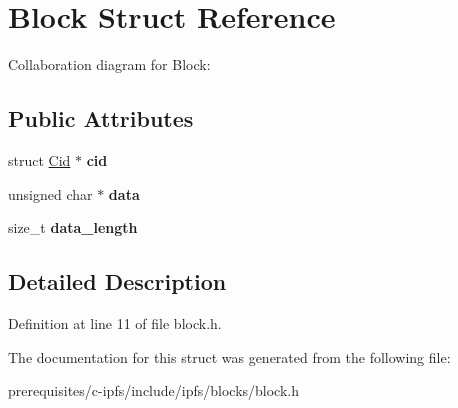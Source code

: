 \hypertarget{struct_block}{}\section{Block Struct Reference}
\label{struct_block}


Collaboration diagram for Block\+:
\subsection*{Public Attributes}
\begin{DoxyCompactItemize}
\item 
\mbox{\label{struct_block_a0df8ba3dc259bb535c80dbc383588edb}} 
struct \mbox{\hyperlink{struct_cid}{Cid}} $\ast$ {\bfseries cid}
\item 
\mbox{\label{struct_block_a771bce9a363938440ba93695d01d2330}} 
unsigned char $\ast$ {\bfseries data}
\item 
\mbox{\label{struct_block_a77a127b78aa112d7b56cc25240303941}} 
size\+\_\+t {\bfseries data\+\_\+length}
\end{DoxyCompactItemize}


\subsection{Detailed Description}


Definition at line 11 of file block.\+h.



The documentation for this struct was generated from the following file\+:\begin{DoxyCompactItemize}
\item 
prerequisites/c-\/ipfs/include/ipfs/blocks/block.\+h\end{DoxyCompactItemize}
